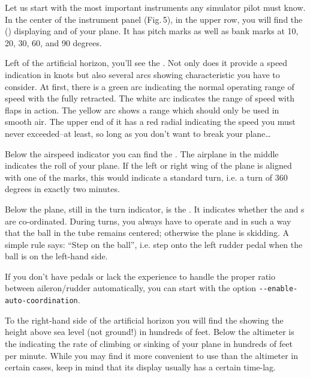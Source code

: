 Let us start with the most important instruments any simulator pilot must know.
In the
center of the instrument panel (Fig.\,5), in the upper row, you will find the
 () displaying 
and
 of your plane. It has pitch marks as well as bank marks at 10, 20,
30, 60,
and 90 degrees.

Left of the artificial horizon, you'll see the . Not
only does
it provide a speed indication in knots but also several arcs showing
characteristic
 you have to consider. At first, there is a green arc
indicating
the normal operating range of speed with the  fully retracted. The
white arc
indicates the range of speed with flaps in action. The yellow arc shows a range
which
should only be used in smooth air. The upper end of it has a red radial
indicating the
speed you must never exceeded--at least, so long as you don't want to break your plane\ldots

Below the airspeed indicator you can find the . The
airplane in the
middle indicates the roll of your plane. If the left or right wing of the plane
is
aligned with one of the marks, this would indicate a standard turn, i.e. a turn
of 360
degrees in exactly two minutes.

Below the plane, still in the turn indicator, is the . It
indicates
whether the  and s are co-ordinated. During turns, you always
have to
operate  and  in such a way that the ball in the
tube
remains centered; otherwise the plane is skidding. A simple rule says:
``Step on the ball'', i.e. step onto the left rudder pedal when
the ball is on the left-hand side.
\medskip

If you don't have pedals or lack the experience to handle the proper
ratio between aileron/rudder automatically, you can start \FlightGear{}
with the option \texttt{-$ $-enable-auto-coordination}.

To the right-hand side of the artificial horizon you will find the 
showing the height
above sea level (not ground!) in hundreds of feet.  Below the altimeter is the
 indicating the rate of climbing or sinking of
your plane
in hundreds of feet per minute. While you may find it more convenient to use
than the
altimeter in certain cases, keep in mind that its display usually has a certain time-lag.

